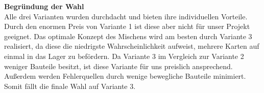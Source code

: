 \begin{table}[H]
    \centering
    \caption{Vergleich der Varianten}
\end{table}

\textbf{\large{Begründung der Wahl}}\\
Alle drei Varianten wurden durchdacht und bieten ihre individuellen Vorteile.
Durch den enormen Preis von Variante 1 ist diese aber nicht für unser Projekt geeignet.
Das optimale Konzept des Mischens wird am besten durch Variante 3 realisiert, da diese die niedrigste Wahrscheinlichkeit aufweist, mehrere Karten auf einmal in das Lager zu befördern.
Da Variante 3 im Vergleich zur Variante 2 weniger Bauteile besitzt, ist diese Variante für uns preislich ansprechend.
Außerdem werden Fehlerquellen durch wenige bewegliche Bauteile minimiert.\\
Somit fällt die finale Wahl auf Variante 3.



